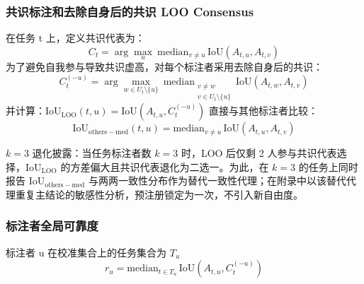 \subsubsection{共识标注和去除自身后的共识 LOO Consensus}
在任务 t 上，定义共识代表为：
\[C_t=\arg\max_{u}\ \mathrm{median}_{v\neq u}\,\mathrm{IoU}\left(A_{t,u},A_{t,v}\right)\]
为了避免自我参与导致共识虚高，对每个标注者采用去除自身后的共识：
\[C_t^{\left(-u\right)}=\arg\max_{w\in U_t\setminus\{u\}}\ \mathrm{median}_{\substack{v\neq w\\ v\in U_t\setminus\{u\}}}\,\mathrm{IoU}\left(A_{t,w},A_{t,v}\right)\]
并计算：$\mathrm{IoU}_{\mathrm{LOO}}\left(t,u\right)=\mathrm{IoU}\left(A_{t,u},C_t^{\left(-u\right)}\right)$
直接与其他标注者比较：
\[\mathrm{IoU}_{\mathrm{others-med}}\left(t,u\right)=\mathrm{median}_{v\neq u}\,\mathrm{IoU}\left(A_{t,u},A_{t,v}\right)\]

$k=3$ 退化披露：当任务标注者数 $k=3$ 时，LOO 后仅剩 2 人参与共识代表选择，$\mathrm{IoU}_{\mathrm{LOO}}$ 的方差偏大且共识代表退化为二选一。为此，在 $k=3$ 的任务上同时报告 $\mathrm{IoU}_{\mathrm{others-med}}$ 与两两一致性分布作为替代一致性代理；在附录中以该替代代理重复主结论的敏感性分析，预注册锁定为一次，不引入新自由度。
\subsubsection{标注者全局可靠度}\label{sec:method-global-reliability}
标注者 u 在校准集合上的任务集合为 $T_u$
\[r_u=\mathrm{median}_{t\in T_u}\,\mathrm{IoU}\left(A_{t,u},C_t^{\left(-u\right)}\right)\]

